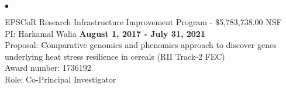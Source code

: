 \documentclass[margin,line,10pt]{res}
\newenvironment{list2}{
  \begin{list}{$\bullet$}{%
      \setlength{\itemsep}{0in}
      \setlength{\parsep}{0in} \setlength{\parskip}{0in}
      \setlength{\topsep}{0in} \setlength{\partopsep}{0in} 
      \setlength{\leftmargin}{0.2in}}}{\end{list}}
\begin{document}
\begin{resume}
\begin{list2}
\vspace{0.5cm}


\begin{comment}
\item Food Safety Challenge Area: Effective Mitigation Strategies for Antimicrobial Resistance  - \$773,607.00  \hfill USDA-NIFA\\
PI: Samodha Fernando   \hfill \textbf{February 15, 2018 - February 14, 2022}\\
Proposal: Investigating mobile genetic elements and resistance gene reservoirs towards understanding the emergence and ecology of antimicrobial resistance in beef cattle production systems  \\
Role: Co-Principal Investigator \\

\vspace{0.5cm}

\item Animal Health and Production and Animal Products: Improved Nutritional Performance, Growth, and Lactation of Animals  - \$500,000.00  \hfill USDA-NIFA\\
PI: Samodha Fernando   \hfill \textbf{March 1, 2018 - February 28, 2022}\\
Proposal: Moving beyond rumen microbiota composition to identify interactions between host genotype and rumen function towards identifying genetic markers and microbial functions that influence feed efficiency  \\
Role: Co-Principal Investigator \\

\vspace{0.5cm}
\end{comment}




\vspace{0.5cm}
  
\item EPSCoR Research Infrastructure Improvement Program - \$5,783,738.00   \hfill NSF \\
PI: Harkamal Walia   \hfill \textbf{August 1, 2017 - July 31, 2021}\\
Proposal:  Comparative genomics and phenomics approach to discover genes underlying heat stress resilience in cereals  (RII Track-2 FEC)  \\
Award number: 1736192 \\
Role: Co-Principal Investigator \\


\end{list2}
\end{resume}
\end{document}
